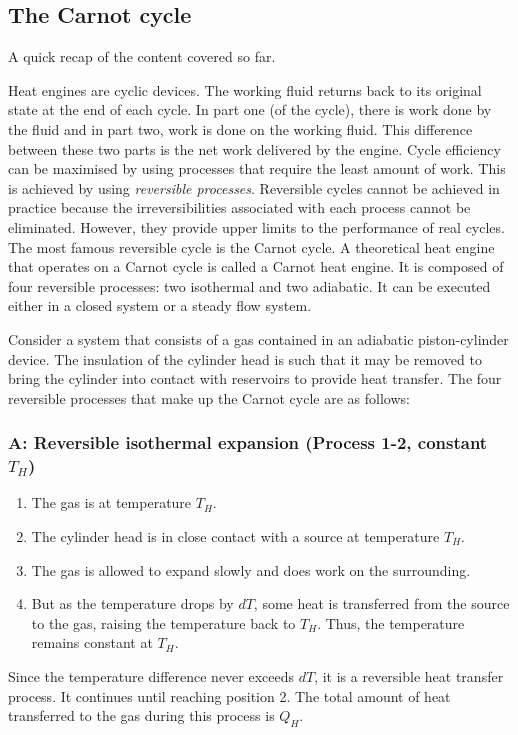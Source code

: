 \subsection{The Carnot cycle}
A quick recap of the content covered so far.

Heat engines are cyclic devices. The working fluid returns back to its original state at the end of each cycle. In part one (of the cycle), there is work done by the fluid and in part two, work is done on the working fluid. This difference between these two parts is the net work delivered by the engine. Cycle efficiency can be maximised by using processes that require the least amount of work. This is achieved by using \emph{reversible processes}. Reversible cycles cannot be achieved in practice because the irreversibilities associated with each process cannot be eliminated. However, they provide upper limits to the performance of real cycles. The most famous reversible cycle is the Carnot cycle. A theoretical heat engine that operates on a Carnot cycle is called a Carnot heat engine. It is composed of four reversible processes: two isothermal and two adiabatic. It can be executed either in a closed system or a steady flow system.

Consider a system that consists of a gas contained in an adiabatic piston-cylinder device. The insulation of the cylinder head is such that it may be removed to bring the cylinder into contact with reservoirs to provide heat transfer. The four reversible processes that make up the Carnot cycle are as follows:
\subsubsection{A: Reversible isothermal expansion (Process 1-2, constant $T_H$)}
\begin{enumerate}[noitemsep]
  \item The gas is at temperature $T_H$.
  \item The cylinder head is in close contact with a source at temperature $T_H$.
  \item The gas is allowed to expand slowly and does work on the surrounding.
  \item But as the temperature drops by $dT$, some heat is transferred from the source to the gas, raising the temperature back to $T_H$. Thus, the temperature remains constant at $T_H$.
\end{enumerate}
Since the temperature difference never exceeds $dT$, it is a reversible heat transfer process. It continues until reaching position 2. The total amount of heat transferred to the gas during this process is $Q_H$.
